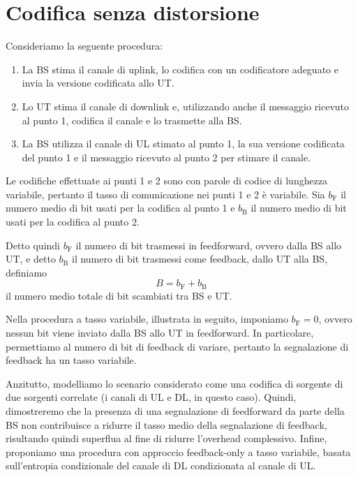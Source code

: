 \chapter{Codifica senza distorsione}

\thispagestyle{empty}

Consideriamo la seguente procedura:
\begin{enumerate}

    \item La BS stima il canale di uplink, lo codifica con un codificatore
        adeguato e invia la versione codificata allo UT.

    \item Lo UT stima il canale di downlink e, utilizzando anche il messaggio
        ricevuto al punto 1, codifica il canale e lo trasmette alla BS.

    \item La BS utilizza il canale di UL stimato al punto 1, la sua versione
        codificata del punto 1 e il messaggio ricevuto al punto 2 per stimare
        il canale.

\end{enumerate}
Le codifiche effettuate ai punti 1 e 2 sono con parole di codice di lunghezza
variabile, pertanto il tasso di comunicazione nei punti 1 e 2 è variabile. Sia
\(b_\mathrm{F}\) il numero medio di bit usati per la codifica al punto 1 e
\(b_\mathrm{B}\) il numero medio di bit usati per la codifica al punto 2.

Detto quindi \(b_\mathrm{F}\) il numero di bit trasmessi in feedforward, ovvero
dalla BS allo UT, e detto \(b_\mathrm{B}\) il numero di bit trasmessi come
feedback, dallo UT alla BS, definiamo
\[
    B = b_\mathrm{F} + b_\mathrm{B}
\]
il numero medio totale di bit scambiati tra BS e UT.

Nella procedura a tasso variabile, illustrata in seguito, imponiamo
\(b_\mathrm{F} = 0\), ovvero nessun bit viene inviato dalla BS allo UT in
feedforward. In particolare, permettiamo al numero di bit di feedback di
variare, pertanto la segnalazione di feedback ha un tasso variabile.

Anzitutto, modelliamo lo scenario considerato come una codifica di sorgente di
due sorgenti correlate (i canali di UL e DL, in questo caso). Quindi,
dimostreremo che la presenza di una segnalazione di feedforward da parte della
BS non contribuisce a ridurre il tasso medio della segnalazione di feedback,
risultando quindi superflua al fine di ridurre l'overhead complessivo. Infine,
proponiamo una procedura con approccio feedback-only a tasso variabile, basata
sull'entropia condizionale del canale di DL condizionata al canale di UL.






